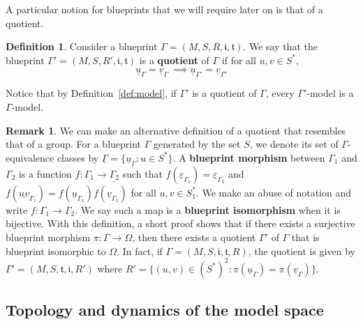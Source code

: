 \documentclass{article}
\theoremstyle{definition}
\newtheorem{remark}[theorem]{Remark}
\newtheorem{defn}[theorem]{Definition} %
\theoremstyle{definition}
\newcommand{\init}{\mathfrak{i}}
\newcommand{\ter}{\mathfrak{t}}
\newcommand{\define}[1]{\textbf{#1}}
\newcommand{\todo}[1]{\textcolor{red}{\textnormal{TODO: #1}}}
\begin{document}

A particular notion for blueprints that we will require later on is that of a quotient.

\begin{defn}
    Consider a blueprint $\Gamma = (M, S, R, \init, \ter)$. We say that the blueprint $\Gamma' = (M, S, R', \init, \ter)$ is a \define{quotient} of $\Gamma$ if for all $u,v\in S^*$, 
    \[\underline{u}_{\Gamma} = \underline{v}_{\Gamma} \ \implies \underline{u}_{\Gamma'} = \underline{v}_{\Gamma'}\]
\end{defn}

Notice that by Definition~\ref{def:model}, if $\Gamma'$ is a quotient of $\Gamma$, every $\Gamma'$-model is a $\Gamma$-model.

\begin{remark}
    We can make an alternative definition of a quotient that resembles that of a group. For a blueprint $\Gamma$ generated by the set $S$, we denote its set of $\Gamma$-equivalence classes by $\underline{\Gamma} = \{\underline{u}_{\Gamma} : u\in S^*\}$. A \define{blueprint morphism} between $\Gamma_1$ and $\Gamma_2$ is a function $f\colon\underline{\Gamma_1}\to \underline{\Gamma_2}$ such that $f(\underline{\varepsilon}_{\Gamma_1})=\underline{\varepsilon}_{\Gamma_2}$ and $f(\underline{uv}_{\Gamma_1}) = f(\underline{u}_{\Gamma_1})f(\underline{v}_{\Gamma_1})$ for all $u,v\in S_1^*$. We make an abuse of notation and write $f:\Gamma_1\to \Gamma_2$. We say such a map is a \define{blueprint isomorphism} when it is bijective. With this definition, a short proof shows that if there exists a surjective blueprint morphism $\pi:\Gamma\to \Omega$, then there exists a quotient $\Gamma'$ of $\Gamma$ that is blueprint isomorphic to $\Omega$. In fact, if $\Gamma = (M,S,\init,\ter,R)$, the quotient is given by $\Gamma' = (M,S,\ter,\init, R')$ where $R' = \{(u,v)\in (S^*)^2 : \pi(\underline{u}_\Gamma) = \pi(\underline{v}_\Gamma)\}$.
\end{remark}

\subsection{Topology and dynamics of the model space}
\end{document}
